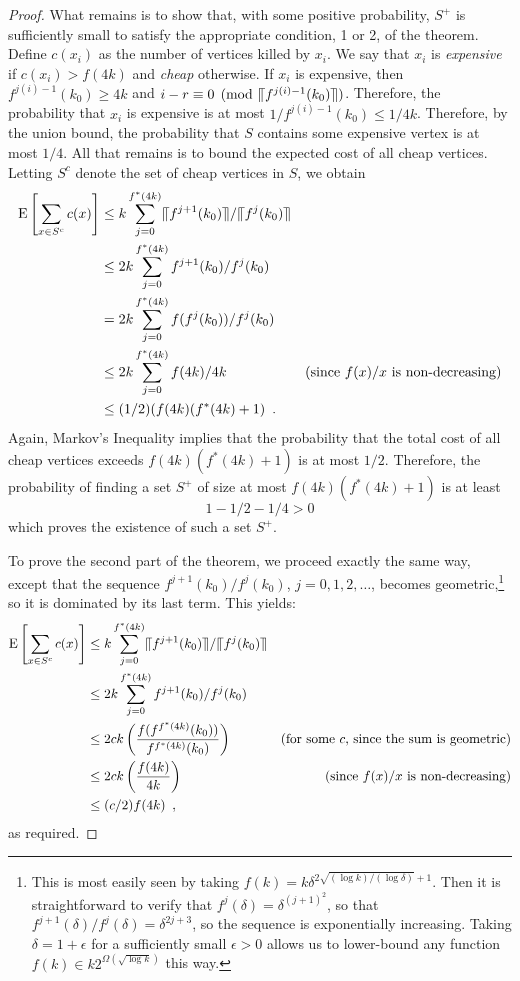 \documentclass{patmorin}
\newcommand{\upen}[1]{\llceil#1\rrceil}
\begin{document}
\begin{proof}
  What remains is to show that, with some positive probability, $S^+$
  is sufficiently small to satisfy the appropriate condition, 1 or 2,
  of the theorem.  Define $c(x_i)$ as the number of vertices killed by
  $x_i$.  We say that $x_i$ is \emph{expensive} if $c(x_i) > f(4k)$ and
  \emph{cheap} otherwise.  If $x_i$ is expensive, then $f^{j(i)-1}(k_0)\ge
  4k$ and $i-r\equiv 0 \pmod{\upen{f^{j(i)-1}(k_0)}}$.  Therefore,
  the probability that $x_i$ is expensive is at most $1/f^{j(i)-1}(k_0)
  \le 1/4k$.  Therefore, by the union bound, the probability that $S$
  contains some expensive vertex is at most $1/4$.  All that remains
  is to bound the expected cost of all cheap vertices. Letting $S^c$
  denote the set of cheap vertices in $S$, we obtain
  \begin{align*}
     \E\left[\sum_{x\in S^c} c(x)\right] 
      & \le  k \sum_{j=0}^{f^*(4k)} \upen{f^{j+1}(k_0)}/\upen{f^j(k_0)} \\
      & \le  2k \sum_{j=0}^{f^*(4k)} f^{j+1}(k_0)/f^j(k_0) \\
      & =  2k \sum_{j=0}^{f^*(4k)} f(f^{j}(k_0))/f^j(k_0) \\
      & \le  2k \sum_{j=0}^{f^*(4k)} f(4k)/4k 
           & \text{(since $f(x)/x$ is non-decreasing)} \\
      & \le  (1/2)(f(4k)(f^*(4k)+1) \enspace .
  \end{align*}
  Again, Markov's Inequality implies that the probability that the total
  cost of all cheap vertices exceeds $f(4k)(f^*(4k)+1)$ is at most $1/2$.
  Therefore, the probability of finding a set $S^+$ of size at most
  $f(4k)(f^*(4k)+1)$ is at least
  \[  
     1 - 1/2 - 1/4 > 0 
  \]
  which proves the existence of such a set $S^+$.
  
  To prove the second part of the theorem, we proceed exactly the same
  way, except that the sequence $f^{j+1}(k_0)/f^j(k_0)$,
  $j=0,1,2,\ldots$, becomes
  geometric,\footnote{This is most easily seen by taking $f(k)
  = k\delta^{2\sqrt{(\log k)/(\log\delta)}+1}$.  Then it is
  straightforward to verify that $f^j(\delta) = \delta^{(j+1)^2}$, so
  that $f^{j+1}(\delta)/f^j(\delta)= \delta^{2j+3}$, so the sequence
  is exponentially increasing.  Taking $\delta = 1+\epsilon$ for a
  sufficiently small $\epsilon>0$ allows us to lower-bound any function
  $f(k)\in k2^{\Omega(\sqrt{\log k})}$ this way.} so it is dominated by
  its last term.  This yields:
  \begin{align*}
  \E\left[\sum_{x\in S^c} c(x)\right] 
      & \le  k \sum_{j=0}^{f^*(4k)} \upen{f^{j+1}(k_0)}/\upen{f^j(k_0)} \\
      & \le  2k \sum_{j=0}^{f^*(4k)} f^{j+1}(k_0)/f^j(k_0) \\
      & \le  2ck\left(\frac{f(f^{f^*(4k)}(k_0))}{f^{f^*(4k)}(k_0)}\right) 
            & \text{(for some $c$, since the sum is geometric)} \\
      & \le  2ck\left(\frac{f(4k)}{4k}\right) 
            & \text{(since $f(x)/x$ is non-decreasing)} \\
      & \le  (c/2)f(4k) \enspace ,
  \end{align*}
  as required.
\end{proof}
\end{document}
